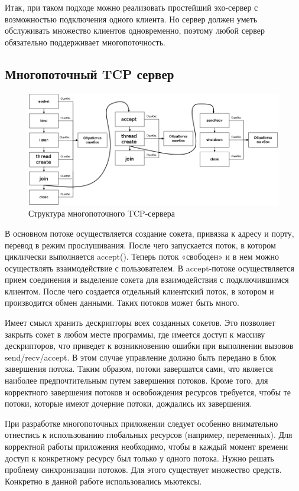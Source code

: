 \documentclass[a4paper]{article}
\begin{document}
Итак, при таком подходе можно реализовать простейший эхо-сервер с возможностью подключения одного клиента. Но сервер должен уметь обслуживать множество клиентов одновременно, поэтому любой сервер обязательно поддерживает многопоточность.
\subsection{Многопоточный TCP сервер}
\begin{figure}[H]
\begin{center}
\includegraphics[scale=0.5]{pics/mtcps.png}
\caption{Структура многопоточного TCP-сервера}
\label{pic:mtcps}
\end{center}
\end{figure}
В основном потоке осуществляется создание сокета, привязка к  адресу и порту, перевод в режим прослушивания. После чего запускается поток, в котором циклически выполняется accept(). Теперь поток «свободен» и в нем можно осуществлять взаимодействие с пользователем.
В accept-потоке осуществляется прием соединения и выделение сокета для взаимодействия с подключившимся клиентом. После чего создается отдельный клиентский поток, в котором и производится обмен данными. Таких потоков может быть много.

Имеет смысл хранить дескрипторы всех созданных сокетов. Это позволяет закрыть сокет в любом месте программы, где имеется доступ к массиву дескрипторов, что приведет к возникновению ошибки при выполнении вызовов send/recv/accept. В этом случае управление должно быть передано в блок завершения потока. Таким образом, потоки завершатся сами, что является наиболее предпочтительным путем завершения потоков. Кроме того, для корректного завершения потоков и освобождения ресурсов требуется, чтобы те потоки, которые имеют дочерние потоки, дождались их завершения.

При разработке многопоточных приложении следует особенно внимательно отнестись к использованию глобальных ресурсов (например, переменных). Для корректной работы приложения необходимо, чтобы в каждый момент времени доступ к конкретному ресурсу был только у одного потока. Нужно решать проблему синхронизации потоков. Для этого существует множество средств. Конкретно в данной работе использовались мьютексы.
\end{document}
